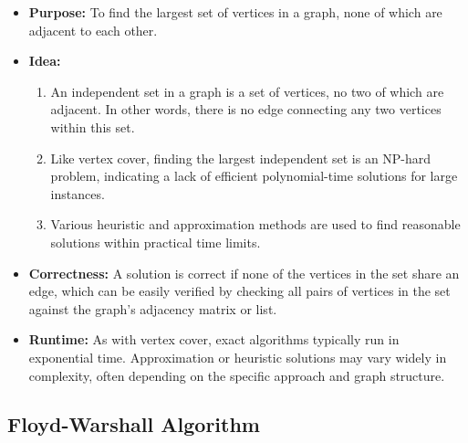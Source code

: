 \documentclass[landscape,7pt]{extarticle}
\begin{document}
\begin{multicols*}{3}
\begin{itemize}
    \item \textbf{Purpose:} To find the largest set of vertices in a graph, none of which are adjacent to each other.
    \item \textbf{Idea:}
    \begin{enumerate}
        \item An independent set in a graph is a set of vertices, no two of which are adjacent. In other words, there is no edge connecting any two vertices within this set.
        \item Like vertex cover, finding the largest independent set is an NP-hard problem, indicating a lack of efficient polynomial-time solutions for large instances.
        \item Various heuristic and approximation methods are used to find reasonable solutions within practical time limits.
    \end{enumerate}
    \item \textbf{Correctness:} A solution is correct if none of the vertices in the set share an edge, which can be easily verified by checking all pairs of vertices in the set against the graph's adjacency matrix or list.
    \item \textbf{Runtime:} As with vertex cover, exact algorithms typically run in exponential time. Approximation or heuristic solutions may vary widely in complexity, often depending on the specific approach and graph structure.
\end{itemize}

\subsection*{Floyd-Warshall Algorithm}


\end{multicols*}
\end{document}
